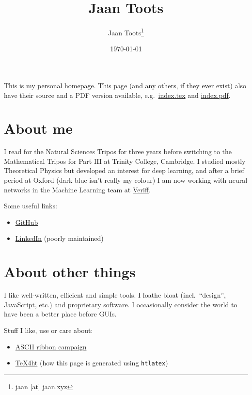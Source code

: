 \documentclass{article}
\title{Jaan Toots}
\author{Jaan Toots\footnote{jaan [at] jaan.xyz}}
\date{\today}
\begin{document}
\maketitle

This is my personal homepage. This page (and any others, if they ever exist)
also have their source and a PDF version available, e.g.\ \url{index.tex} and
\url{index.pdf}.

\section{About me}

I read for the Natural Sciences Tripos for three years before switching to the
Mathematical Tripos for Part III at Trinity College, Cambridge. I studied
mostly Theoretical Physics but developed an interest for deep learning, and
after a brief period at Oxford (dark blue isn't really my colour) I am now
working with neural networks in the Machine Learning team at
\href{https://veriff.me/}{Veriff}.

Some useful links:

\begin{itemize}
  \item \href{https://github.com/jaantoots}{GitHub}
  \item \href{https://www.linkedin.com/in/jaantoots/}{LinkedIn} (poorly
    maintained)
\end{itemize}

\section{About other things}

I like well-written, efficient and simple tools. I loathe bloat (incl.\
``design'', JavaScript, etc.) and proprietary software. I occasionally consider
the world to have been a better place before GUIs.

Stuff I like, use or care about:

\begin{itemize}
  \item \href{http://www.asciiribbon.org/}{ASCII ribbon campaign}
  \item \href{https://www.tug.org/tex4ht/}{TeX4ht} (how this page is generated
    using \texttt{htlatex})
\end{itemize}
\end{document}

